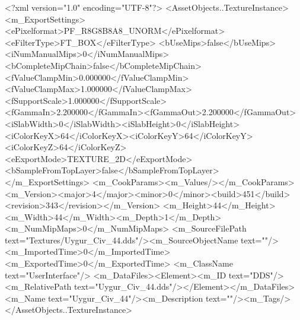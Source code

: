 <?xml version="1.0" encoding="UTF-8"?>
<AssetObjects..TextureInstance>
  <m_ExportSettings>
    <ePixelformat>PF_R8G8B8A8_UNORM</ePixelformat><eFilterType>FT_BOX</eFilterType>
    <bUseMips>false</bUseMips><iNumManualMips>0</iNumManualMips><bCompleteMipChain>false</bCompleteMipChain>
    <fValueClampMin>0.000000</fValueClampMin><fValueClampMax>1.000000</fValueClampMax><fSupportScale>1.000000</fSupportScale>
    <fGammaIn>2.200000</fGammaIn><fGammaOut>2.200000</fGammaOut><iSlabWidth>0</iSlabWidth><iSlabHeight>0</iSlabHeight>
    <iColorKeyX>64</iColorKeyX><iColorKeyY>64</iColorKeyY><iColorKeyZ>64</iColorKeyZ>
    <eExportMode>TEXTURE_2D</eExportMode><bSampleFromTopLayer>false</bSampleFromTopLayer>
  </m_ExportSettings>
  <m_CookParams><m_Values/></m_CookParams>
  <m_Version><major>4</major><minor>0</minor><build>451</build><revision>343</revision></m_Version>
  <m_Height>44</m_Height><m_Width>44</m_Width><m_Depth>1</m_Depth><m_NumMipMaps>0</m_NumMipMaps>
  <m_SourceFilePath text="Textures/Uygur_Civ_44.dds"/><m_SourceObjectName text=""/>
  <m_ImportedTime>0</m_ImportedTime><m_ExportedTime>0</m_ExportedTime>
  <m_ClassName text="UserInterface"/>
  <m_DataFiles><Element><m_ID text="DDS"/><m_RelativePath text="Uygur_Civ_44.dds"/></Element></m_DataFiles>
  <m_Name text="Uygur_Civ_44"/><m_Description text=""/><m_Tags/>
</AssetObjects..TextureInstance>
